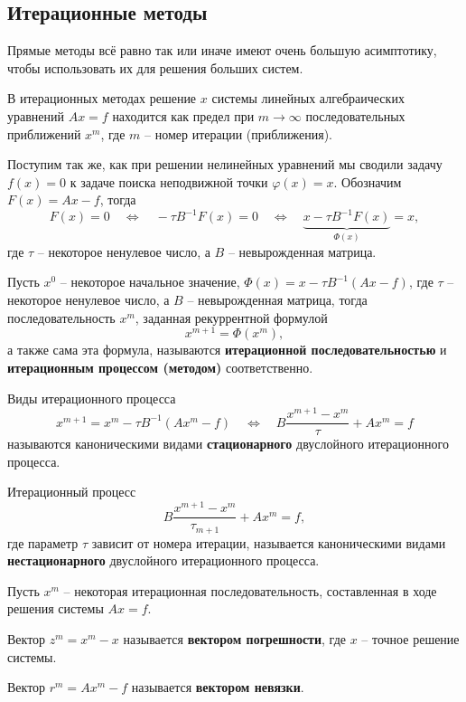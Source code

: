 \documentclass{article}
\begin{document}
\subsection{Итерационные методы}
Прямые методы всё равно так или иначе имеют очень большую асимптотику, чтобы
использовать их для решения больших систем.

В итерационных методах решение $x$ системы линейных алгебраических уравнений
$Ax=f$ находится как предел при $m\to\infty$ последовательных приближений $x^m$,
где $m$ -- номер итерации (приближения).

Поступим так же, как при решении нелинейных уравнений мы сводили задачу $f(x)=0$
к задаче поиска неподвижной точки $\varphi(x)=x$. Обозначим $F(x)=Ax-f$, тогда
\[F(x)=0\quad\Leftrightarrow\quad -\tau B^{-1}F(x)=0\quad\Leftrightarrow\quad
\underset{\Phi(x)}{\underbrace{x-\tau B^{-1}F(x)}}=x,\]
где $\tau$ -- некоторое ненулевое число, а $B$ -- невырожденная матрица.

\begin{define}\label{eq:sle_iterative_method}
	Пусть $x^0$ -- некоторое начальное значение, $\Phi(x)=x-\tau
	B^{-1}(Ax-f)$, где $\tau$ -- некоторое ненулевое число, а $B$ --
	невырожденная матрица, тогда последовательность $x^m$, заданная
	рекуррентной формулой
	\[x^{m+1}=\Phi(x^m),\]
	а также сама эта формула, называются \textbf{итерационной
	последовательностью} и \textbf{итерационным процессом (методом)}
	соответственно.
\end{define}

\begin{define}\label{eq:static_canon_process}
	Виды итерационного процесса
	\[x^{m+1}=x^m-\tau B^{-1}(Ax^m-f)\quad\Leftrightarrow\quad
	B\frac{x^{m+1}-x^m}{\tau}+Ax^m=f\]
	называются каноническими видами \textbf{стационарного} двуслойного
	итерационного процесса.
\end{define}

\begin{define}
	Итерационный процесс
	\[B\frac{x^{m+1}-x^m}{\tau_{m+1}}+Ax^m=f,\]
	где параметр $\tau$ зависит от номера итерации, называется каноническими
	видами \textbf{нестационарного} двуслойного итерационного процесса.
\end{define}

\begin{define}
	Пусть $x^m$ -- некоторая итерационная последовательность, составленная
	в ходе решения системы $Ax=f$.

	Вектор $z^m=x^m-x$ называется \textbf{вектором погрешности}, где $x$ --
	точное решение системы.

	Вектор $r^m=Ax^m-f$ называется \textbf{вектором невязки}.
\end{define}
\end{document}
